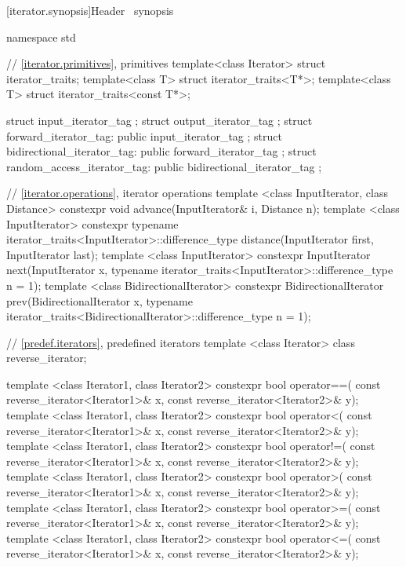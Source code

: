 [iterator.synopsis]{Header \ synopsis}

%
%
\begin{codeblock}
namespace std {
  // \ref{iterator.primitives}, primitives
  template<class Iterator> struct iterator_traits;
  template<class T> struct iterator_traits<T*>;
  template<class T> struct iterator_traits<const T*>;

  struct input_iterator_tag { };
  struct output_iterator_tag { };
  struct forward_iterator_tag: public input_iterator_tag { };
  struct bidirectional_iterator_tag: public forward_iterator_tag { };
  struct random_access_iterator_tag: public bidirectional_iterator_tag { };

  // \ref{iterator.operations}, iterator operations
  template <class InputIterator, class Distance>
    constexpr void advance(InputIterator& i, Distance n);
  template <class InputIterator>
    constexpr typename iterator_traits<InputIterator>::difference_type
    distance(InputIterator first, InputIterator last);
  template <class InputIterator>
    constexpr InputIterator next(InputIterator x,
      typename iterator_traits<InputIterator>::difference_type n = 1);
  template <class BidirectionalIterator>
    constexpr BidirectionalIterator prev(BidirectionalIterator x,
      typename iterator_traits<BidirectionalIterator>::difference_type n = 1);

  // \ref{predef.iterators}, predefined iterators
  template <class Iterator> class reverse_iterator;

  template <class Iterator1, class Iterator2>
    constexpr bool operator==(
      const reverse_iterator<Iterator1>& x,
      const reverse_iterator<Iterator2>& y);
  template <class Iterator1, class Iterator2>
    constexpr bool operator<(
      const reverse_iterator<Iterator1>& x,
      const reverse_iterator<Iterator2>& y);
  template <class Iterator1, class Iterator2>
    constexpr bool operator!=(
      const reverse_iterator<Iterator1>& x,
      const reverse_iterator<Iterator2>& y);
  template <class Iterator1, class Iterator2>
    constexpr bool operator>(
      const reverse_iterator<Iterator1>& x,
      const reverse_iterator<Iterator2>& y);
  template <class Iterator1, class Iterator2>
    constexpr bool operator>=(
      const reverse_iterator<Iterator1>& x,
      const reverse_iterator<Iterator2>& y);
  template <class Iterator1, class Iterator2>
    constexpr bool operator<=(
      const reverse_iterator<Iterator1>& x,
      const reverse_iterator<Iterator2>& y);

}
\end{codeblock}
